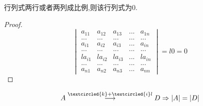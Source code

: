 \documentclass[blue,normal,cn]{elegantnote}
\begin{document}
\begin{property}
    行列式两行或者两列成比例,则该行列式为0.
\end{property}

\begin{proof}
    \begin{equation*}
        \begin{vmatrix} 
            a_{11}&a_{12} & a_{13} &...& a_{1n}\\
            ...&...&...&...&...\\
            a_{i1}&a_{i2} & a_{i3} &...& a_{in}\\
            ...&...&...&...&...\\
            la_{i1}&la_{i2} & la_{i3} &...& la_{in}\\
            ...&...&...&...&...\\
            a_{n1}&a_{n2} & a_{n3} &...& a_{nn}
            \end{vmatrix}
        =l0=0
        \end{equation*}
\end{proof}

\begin{property}
   \begin{equation*}
    A\stackrel{\textcircled{k}+\textcircled{i}l}{\longrightarrow}D \Rightarrow |A|=|D|
    \end{equation*}
\end{property}
\end{document}
